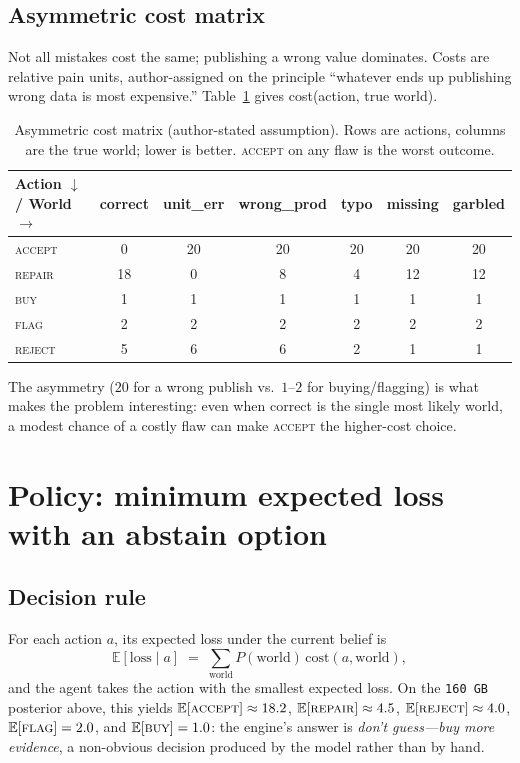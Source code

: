 \documentclass[11pt]{article}
\begin{document}
\subsection{Asymmetric cost matrix}
Not all mistakes cost the same; publishing a wrong value dominates. Costs are relative
pain units, author-assigned on the principle ``whatever ends up publishing wrong data
is most expensive.'' Table~\ref{tab:cost} gives cost(action, true world).

\begin{table}[h]
\centering
\caption{Asymmetric cost matrix (author-stated assumption). Rows are actions, columns
are the true world; lower is better. \textsc{accept} on any flaw is the worst outcome.}
\label{tab:cost}
\begin{tabular}{@{}l cccccc@{}}
\toprule
Action $\downarrow$ / World $\rightarrow$ & \textsf{correct} & \textsf{unit\_err} & \textsf{wrong\_prod} & \textsf{typo} & \textsf{missing} & \textsf{garbled} \\
\midrule
\textsc{accept} & 0 & 20 & 20 & 20 & 20 & 20 \\
\textsc{repair} & 18 & 0 & 8 & 4 & 12 & 12 \\
\textsc{buy}    & 1 & 1 & 1 & 1 & 1 & 1 \\
\textsc{flag}   & 2 & 2 & 2 & 2 & 2 & 2 \\
\textsc{reject} & 5 & 6 & 6 & 2 & 1 & 1 \\
\bottomrule
\end{tabular}
\end{table}

\noindent
The asymmetry ($20$ for a wrong publish vs.\ $1$--$2$ for buying/flagging) is what
makes the problem interesting: even when \textsf{correct} is the single most likely
world, a modest chance of a costly flaw can make \textsc{accept} the higher-cost choice.

\section{Policy: minimum expected loss with an abstain option}
\label{sec:policy}

\subsection{Decision rule}
For each action $a$, its expected loss under the current belief is
\begin{equation}
\mathbb{E}[\text{loss}\mid a] \;=\; \sum_{\text{world}} P(\text{world})\,\text{cost}(a,\text{world}),
\label{eq:eloss}
\end{equation}
and the agent takes the action with the smallest expected loss. On the
\texttt{160\,GB} posterior above, this yields $\mathbb{E}[\textsc{accept}]\approx18.2$,
$\mathbb{E}[\textsc{repair}]\approx4.5$, $\mathbb{E}[\textsc{reject}]\approx4.0$,
$\mathbb{E}[\textsc{flag}]=2.0$, and $\mathbb{E}[\textsc{buy}]=1.0$: the engine's
answer is \emph{don't guess---buy more evidence}, a non-obvious decision produced by
the model rather than by hand.
\end{document}
